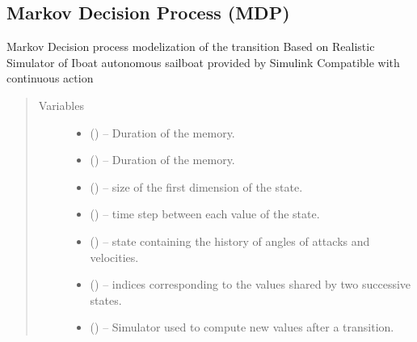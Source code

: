 \documentclass[letterpaper,10pt,english]{sphinxmanual}
\begin{document}
\subsection{Markov Decision Process (MDP)}
\label{\detokenize{package1:module-mdp}}\label{\detokenize{package1:markov-decision-process-mdp}}

\begin{fulllineitems}
\label{\detokenize{package1:mdp.ContinuousMDP}}
Markov Decision process modelization of the transition
Based on Realistic Simulator of Iboat autonomous sailboat provided by Simulink
Compatible with continuous action
\begin{quote}\begin{description}
\item[{Variables}] \leavevmode\begin{itemize}
\item {} 
 () -- Duration of the memory.

\item {} 
 () -- Duration of the memory.

\item {} 
 () -- size of the first dimension of the state.

\item {} 
 () -- time step between each value of the state.

\item {} 
 (\sphinxstyleliteralemphasis{(}\sphinxstyleliteralemphasis{)}) -- state containing the history of angles of attacks and velocities.

\item {} 
 () -- indices corresponding to the values shared by two successive states.

\item {} 
 ({\hyperref[\detokenize{package1:module-Simulator}]{}}) -- Simulator used to compute new values after a transition.


\end{itemize}
\end{description}
\end{quote}
\end{fulllineitems}
\end{document}
